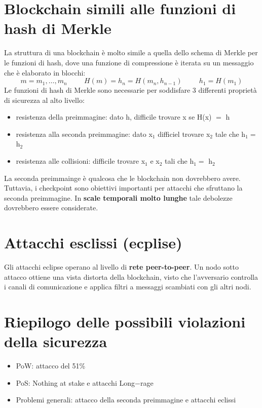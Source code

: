 \section{Blockchain simili alle funzioni di hash di Merkle}
La struttura di una blockchain è molto simile a quella dello schema di Merkle per le funzioni di hash, dove una funzione di compressione è iterata su un messaggio che è elaborato in blocchi:
\[
m = {m_1, \dots, m_n} \hspace{1cm} H(m) = h_n = H(m_n, h_{n-1}) \hspace{1cm} h_1 = H(m_1)
\]
Le funzioni di hash di Merkle sono necessarie per soddisfare 3 differenti proprietà di sicurezza al alto livello:
\begin{itemize}
    \item resistenza della preimmagine: dato h, difficile trovare x se H(x) $=$ h
    \item resistenza alla seconda preimmagine: dato x$_1$ difficiel trovare x$_2$ tale che h$_1 = $ h$_2$
    \item resistenza alle collisioni: difficile trovare x$_1$ e x$_2$ tali che h$_1 = $ h$_2$
\end{itemize}
La seconda preimmainge è qualcosa che le blockchain non dovrebbero avere. Tuttavia, i checkpoint sono obiettivi importanti per attacchi che sfruttano la seconda preimmagine. In \textbf{scale temporali molto lunghe} tale debolezze dovrebbero essere considerate.

\section{Attacchi esclissi (ecplise)}
Gli attacchi eclipse operano al livello di \textbf{rete peer-to-peer}. Un nodo sotto attacco ottiene una vista distorta della blockchain, visto che l'avversario controlla i canali di comunicazione e applica filtri a messaggi scambiati con gli altri nodi.

\section{Riepilogo delle possibili violazioni della sicurezza}
\begin{itemize}
    \item PoW: attacco del 51\%
    \item PoS: Nothing at stake e attacchi Long$-$rage
    \item Problemi generali: attacco della seconda preimmagine e attacchi eclissi
\end{itemize}


